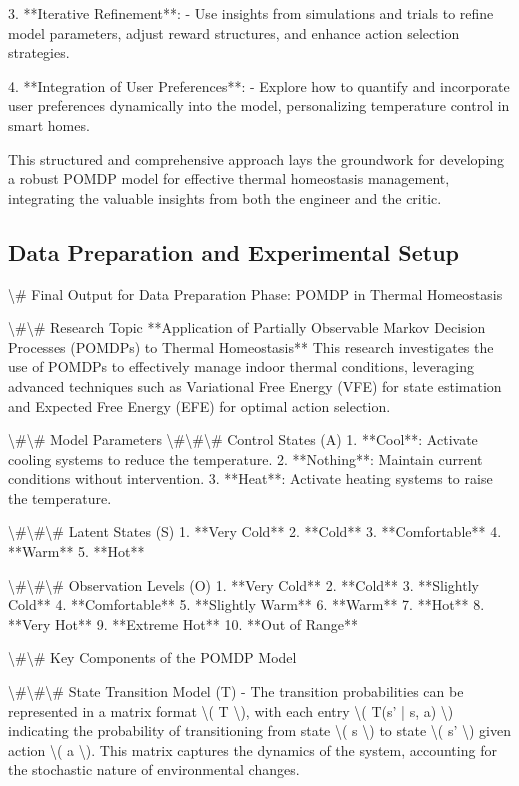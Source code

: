 \documentclass[11pt,a4paper]{article}
\begin{document}
3. **Iterative Refinement**: 
   - Use insights from simulations and trials to refine model parameters, adjust reward structures, and enhance action selection strategies.

4. **Integration of User Preferences**: 
   - Explore how to quantify and incorporate user preferences dynamically into the model, personalizing temperature control in smart homes.

This structured and comprehensive approach lays the groundwork for developing a robust POMDP model for effective thermal homeostasis management, integrating the valuable insights from both the engineer and the critic.
\subsection{Data Preparation and Experimental Setup}

\textbackslash{}# Final Output for Data Preparation Phase: POMDP in Thermal Homeostasis

\textbackslash{}#\textbackslash{}# Research Topic
**Application of Partially Observable Markov Decision Processes (POMDPs) to Thermal Homeostasis**  
This research investigates the use of POMDPs to effectively manage indoor thermal conditions, leveraging advanced techniques such as Variational Free Energy (VFE) for state estimation and Expected Free Energy (EFE) for optimal action selection.

\textbackslash{}#\textbackslash{}# Model Parameters
\textbackslash{}#\textbackslash{}#\textbackslash{}# Control States (A)
1. **Cool**: Activate cooling systems to reduce the temperature.
2. **Nothing**: Maintain current conditions without intervention.
3. **Heat**: Activate heating systems to raise the temperature.

\textbackslash{}#\textbackslash{}#\textbackslash{}# Latent States (S)
1. **Very Cold**
2. **Cold**
3. **Comfortable**
4. **Warm**
5. **Hot**

\textbackslash{}#\textbackslash{}#\textbackslash{}# Observation Levels (O)
1. **Very Cold**
2. **Cold**
3. **Slightly Cold**
4. **Comfortable**
5. **Slightly Warm**
6. **Warm**
7. **Hot**
8. **Very Hot**
9. **Extreme Hot**
10. **Out of Range**

\textbackslash{}#\textbackslash{}# Key Components of the POMDP Model

\textbackslash{}#\textbackslash{}#\textbackslash{}# State Transition Model (T)
- The transition probabilities can be represented in a matrix format \textbackslash{}( T \textbackslash{}), with each entry \textbackslash{}( T(s' | s, a) \textbackslash{}) indicating the probability of transitioning from state \textbackslash{}( s \textbackslash{}) to state \textbackslash{}( s' \textbackslash{}) given action \textbackslash{}( a \textbackslash{}). This matrix captures the dynamics of the system, accounting for the stochastic nature of environmental changes.
\end{document}

